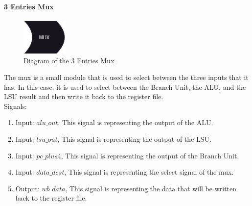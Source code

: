 \paragraph{3 Entries Mux}

\begin{figure}[H]
    \centering
    \includegraphics[width=0.20\textwidth]{../diagrams/writeback/mux.png}
    \caption{Diagram of the 3 Entries Mux}
    \label{fig:mux3}
\end{figure}

The mux is a small module that is used to select between the three inputs that it has. In this case, it is used to select
between the Branch Unit, the ALU, and the LSU result and then write it back to the register file. \\

Signals:
\begin{enumerate}[label={\textbullet}]
    \item Input: $alu\_out$, This signal is representing the output of the ALU.
    \item Input: $lsu\_out$, This signal is representing the output of the LSU.
    \item Input: $pc\_plus4$, This signal is representing the output of the Branch Unit.
    \item Input: $data\_dest$, This signal is representing the select signal of the mux.
    \item Output: $wb\_data$, This signal is representing the data that will be written back to the register file.
\end{enumerate}


